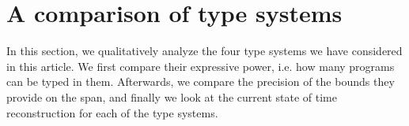 \section{A comparison of type systems}\label{sec:comparison}

%
%


    




In this section, we qualitatively analyze the four type systems we have considered in this article. We first compare their expressive power, i.e. how many programs can be typed in them. Afterwards, we compare the precision of the bounds they provide on the span, and finally we look at the current state of time reconstruction for each of the type systems.

